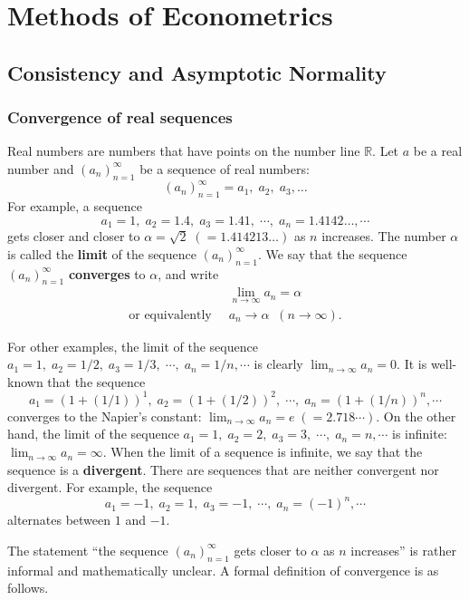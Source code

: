 \documentclass[11pt, A4paper, openany, uplatex]{book}
\begin{document}
\part{Methods of Econometrics}

\chapter{Consistency and Asymptotic Normality}\label{chap:LLN_CLT}
\section{Convergence of real sequences}
Real numbers are numbers that have points on the number line $\mathbb{R}$.
Let $a$ be a real number and $(a_n)_{n=1}^\infty$ be a sequence of real numbers:
\[
	(a_n)_{n=1}^\infty = a_1, \; a_2, \; a_3, \ldots
\]
For example, a sequence
\[
	a_1 = 1, \; a_2 = 1.4, \; a_3 = 1.41, \; \cdots, \; a_n = 1.4142\ldots, \cdots
\]
gets closer and closer to $\alpha = \sqrt{2} \; (= 1.414213\ldots)$ as $n$ increases.
The number $\alpha$ is called the \textbf{limit} of the sequence $(a_n)_{n=1}^\infty$. 
We say that the sequence $(a_n)_{n=1}^\infty$ \textbf{converges} to $\alpha$, and write
\begin{align*}
	& \lim_{n\to\infty}a_n = \alpha \\
	\text{or equivalently} \;\; & a_n \to \alpha \;\; (n\to\infty).
\end{align*}

For other examples, the limit of the sequence $a_1 = 1, \; a_2 = 1/2, \; a_3 = 1/3, \; \cdots, \; a_n = 1/n, \cdots$ is clearly $\lim_{n\to\infty}a_n = 0$.
It is well-known that the sequence
\[
	a_1 = (1 + (1/1))^1, \; a_2 = (1 + (1/2))^2, \; \cdots, \; a_n = (1 + (1/n))^n, \cdots
\]
converges to the Napier's constant: $\lim_{n\to\infty}a_n = e \; (=2.718 \cdots)$.
On the other hand, the limit of the sequence $a_1 = 1, \; a_2 = 2, \; a_3 = 3, \;\cdots, \; a_n = n, \cdots$ is infinite: $\lim_{n\to\infty}a_n = \infty$.
When the limit of a sequence is infinite, we say that the sequence is a \textbf{divergent}.
There are sequences that are neither convergent nor divergent.
For example, the sequence
\[
	a_1 = -1, \; a_2 = 1, \; a_3 = -1, \; \cdots, \; a_n = (-1)^n, \cdots
\]
alternates between $1$ and $-1$.

The statement ``the sequence $(a_n)_{n=1}^\infty$ gets closer to $\alpha$ as $n$ increases'' is rather informal and mathematically unclear.
A formal definition of convergence is as follows.
\end{document}
